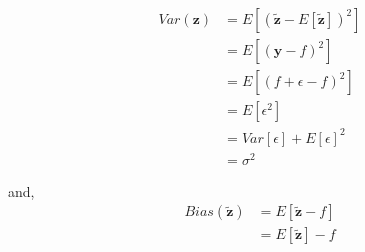 \begin{align*}
Var(\textbf{z}) &= E[(\boldsymbol{\tilde{z}} - E[\boldsymbol{\tilde{z}}])^{2}]\\ &= E[(\textbf{y}-f)^{2}]\\ &= E[(f + \epsilon - f)^{2}]\\ &= E[\epsilon^{2}]\\ &= Var[\epsilon] + E[\epsilon]^{2}\\ &= \sigma^{2}
\end{align*}

\noindent and, \\

\begin{align*}
Bias(\boldsymbol{\tilde{z}}) &= E[\boldsymbol{\tilde{z}} - f]\\ &= E[\boldsymbol{\tilde{z}}] - f
\end{align*}
